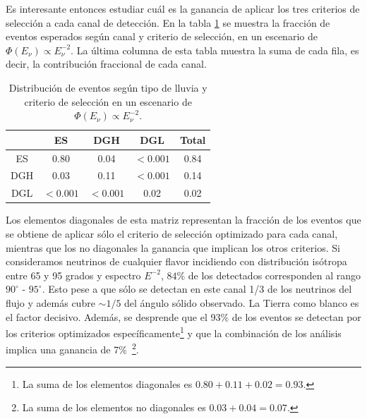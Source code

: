 	Es interesante entonces estudiar cuál es la ganancia de aplicar los tres criterios de selección a cada canal de detección.
	En la tabla \ref{tab:expDist} se muestra la fracción de eventos esperados según canal y criterio de selección, en un escenario de $\Phi(E_\nu)\propto E_\nu^{-2}$.
	La última columna de esta tabla muestra la suma de cada fila, es decir, la contribuci\'on fraccional de cada canal.
	\begin{table}[ht!]
		\begin{center}\renewcommand{\arraystretch}{1.4}
			\begin{tabular}{|c|c|c|c|c|}
			\hline
			\diagbox{Lluvia}{Criterio} & ES & DGH & DGL  & Total\\ \hline
			ES     &    0.80       &    0.04       &     $<0.001$ & 0.84 \\ \hline
			DGH    &    0.03       &    0.11       &     $<0.001$ & 0.14 \\ \hline
			DGL    &    $<0.001$   &    $<0.001$   &     0.02     & 0.02 \\
			\hline
			\end{tabular}
		\end{center}
		
		\caption{\label{tab:expDist}Distribución de eventos según tipo de lluvia y criterio de selección en un escenario de $\Phi(E_\nu)\propto E_\nu^{-2}$.}
	\end{table}
	Los elementos diagonales de esta matriz representan la fracción de los eventos que se obtiene de aplicar sólo el criterio de selección optimizado para cada canal, mientras que los no diagonales la ganancia que implican los otros criterios.
	Si consideramos neutrinos de cualquier flavor incidiendo con distribuci\'on is\'otropa entre 65 y 95 grados y espectro $E^{-2}$, $84\%$ de los detectados corresponden al rango $90^\circ\text{ - }95^\circ$. 
	Esto pese a que s\'olo se detectan en este canal 1/3 de los neutrinos del flujo y adem\'as cubre $\sim 1/5$ del \'angulo s\'olido observado.
	La Tierra como blanco es el factor decisivo.
	Adem\'as, se desprende que el 93$\%$ de los eventos se detectan por los criterios optimizados específicamente\footnote{La suma de los elementos diagonales es $0.80+0.11+0.02=0.93$.} y que la combinación de los análisis implica una ganancia de 7$\%$~\footnote{La suma de los elementos no diagonales es $0.03+0.04=0.07$.}.
